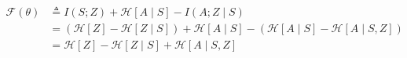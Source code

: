 \documentclass{beamer}
\begin{document}
\begin{frame}
    \vspace{1cm}
    
    \[
\begin{aligned}
\mathcal{F}(\theta) &\triangleq I(S; Z) + \mathcal{H}[A \mid S] - I(A; Z \mid S) \\
&= (\mathcal{H}[Z] - \mathcal{H}[Z \mid S]) + \mathcal{H}[A \mid S] - (\mathcal{H}[A \mid S] - \mathcal{H}[A \mid S, Z]) \\
&= \mathcal{H}[Z] - \mathcal{H}[Z \mid S] + \mathcal{H}[A \mid S, Z]
\end{aligned}
\]
\end{frame}
\end{document}
